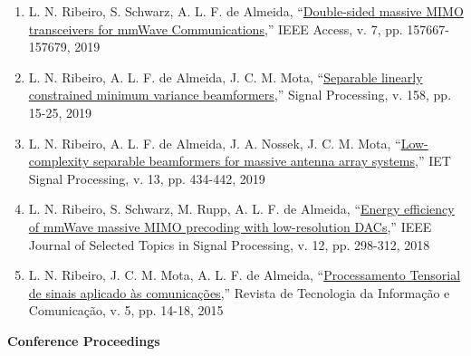 \begin{enumerate}
	\item L. N. Ribeiro, S. Schwarz, A. L. F. de Almeida, ``\href{https://doi.org/10.1109/ACCESS.2019.2949945}{Double-sided massive MIMO transceivers for mmWave Communications},'' IEEE Access, v. 7, pp. 157667-157679, 2019
	
	\item L. N. Ribeiro, A. L. F. de Almeida, J. C. M. Mota, ``\href{https://doi.org/10.1016/j.sigpro.2018.12.010}{Separable linearly constrained minimum variance beamformers},'' Signal Processing, v. 158, pp. 15-25, 2019
	
	\item L. N. Ribeiro, A. L. F. de Almeida, J. A. Nossek, J. C. M. Mota, ``\href{https://doi.org/10.1049/iet-spr.2018.5115}{Low-complexity separable beamformers for massive antenna array systems},'' IET Signal Processing, v. 13, pp. 434-442, 2019
	
	\item L. N. Ribeiro, S. Schwarz, M. Rupp, A. L. F. de Almeida, ``\href{https://doi.org/10.1109/JSTSP.2018.2824762}{Energy efficiency of mmWave massive MIMO precoding with low-resolution DACs},'' IEEE Journal of Selected Topics in Signal Processing, v. 12, pp. 298-312, 2018
	
	\item L. N. Ribeiro, J. C. M. Mota, A. L. F. de Almeida, ``\href{http://rtic.com.br/index.php/rtic/article/view/65}{Processamento Tensorial de sinais aplicado às comunicações},'' Revista de Tecnologia da Informação e Comunicação, v. 5, pp. 14-18, 2015
\end{enumerate}

{\bf Conference Proceedings}\\


